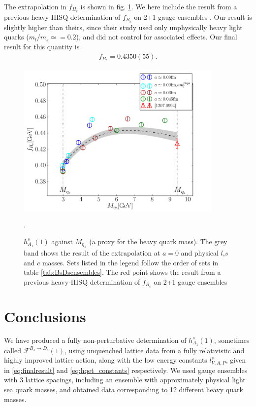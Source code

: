 The extrapolation in $f_{H_c}$ is shown in fig. \ref{fig:fHc_vsmh}. We here include the result from a previous heavy-HISQ determination of $f_{B_c}$ on 2+1 gauge ensembles \cite{McNeile:2012qf}. Our result is slightly higher than theirs, since their study used only unphysically heavy light quarks ($m_l/m_s\simeq=0.2$), and did not control for associated effects. Our final result for this quantity is
\begin{align}
  f_{B_c} = 0.4350(55).
\end{align}

\begin{figure}[htb!]
  \begin{center}
  \hspace{-20pt}
  \includegraphics[width=0.90\textwidth]{images/BsDsstar/fHcvsmh.pdf}
  \caption{ $h_{A_1}^s(1)$ against $M_{\eta_h}$ (a proxy for the heavy quark mass). The grey band shows the result of the extrapolation at $a=0$ and physical $l$,$s$ and $c$ masses. Sets listed in the legend follow the order of sets in table \ref{tab:BsDsensembles}. The red point shows the result from a previous heavy-HISQ determination of $f_{B_c}$ on 2+1 gauge ensembles \cite{McNeile:2012qf}\label{fig:fHc_vsmh}}.
  \end{center}
\end{figure}

\section{Conclusions}
\label{sec:conclusions}

We have produced a fully non-perturbative determination of $h_{A_1}^s(1)$, sometimes called $\mathcal{F}^{B_s\to D_s}(1)$, using unquenched lattice data from a fully relativistic and highly improved lattice action, along with the low energy constants $l_{V,A,P}^s$, given in \eqref{eq:finalresult} and \eqref{eq:hqet_constants} respectively. We used gauge ensembles with 3 lattice spacings, including an ensemble with approximately physical light sea quark masses, and obtained data corresponding to 12 different heavy quark masses.

